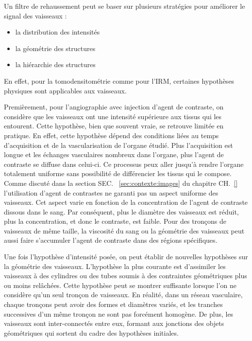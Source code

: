 Un filtre de rehaussement peut se baser sur plusieurs stratégies pour améliorer le signal des vaisseaux :

\begin{itemize}
\item la distribution des intensités
\item la géométrie des structures
\item la hiérarchie des structures
\end{itemize}

En effet, pour la tomodensitométrie comme pour l'IRM, certaines hypothèses physiques sont applicables aux vaisseaux.

Premièrement, pour l'angiographie avec injection d'agent de contraste, on considère que les vaisseaux ont une intensité supérieure aux tissus qui les entourent. Cette hypothèse, bien que souvent vraie, se retrouve limitée en pratique. En effet, cette hypothèse dépend des conditions liées au temps d'acquisition et de la vascularisation de l'organe étudié. Plus l'acquisition est longue et les échanges vasculaires nombreux dans l'organe, plus l'agent de contraste se diffuse dans celui-ci. Ce processus peux aller jusqu'à rendre l'organe totalement uniforme sans possibilité de différencier les tissus qui le compose. Comme discuté dans la section SEC. ~\ref{sec:contexte:images} du chapitre CH.~\ref{} l'utilisation d'agent de contrastes ne garanti pas un aspect uniforme des vaisseaux. Cet aspect varie en fonction de la concentration de l'agent de contraste dissous dans le sang. Par conséquent, plus le diamètre des vaisseaux est réduit, plus la concentration, et donc le contraste, est faible. Pour des tronçons de vaisseaux de même taille, la viscosité du sang ou la géométrie des vaisseaux peut aussi faire s'accumuler l'agent de contraste dans des régions spécifiques.

Une fois l'hypothèse d'intensité posée, on peut établir de nouvelles hypothèses sur la géométrie des vaisseaux. L'hypothèse la plus courante est d'assimiler les vaisseaux à des cylindres ou des tubes soumis à des contraintes géométriques plus ou moins relâchées. Cette hypothèse peut se montrer suffisante lorsque l'on ne considère qu'un seul tronçon de vaisseaux. En réalité, dans un réseau vasculaire, chaque tronçons peut avoir des formes et diamètres variés, et les tranches successives d'un même tronçon ne sont pas forcément homogène. De plus, les vaisseaux sont inter-connectés entre eux, formant aux jonctions des objets géométriques qui sortent du cadre des hypothèses initiales.

